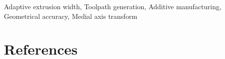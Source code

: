 \documentclass[5p,twocolumn,10pt,times]{elsarticle}
\theoremstyle{definition}
\newcommand{\temp}[1]{\textcolor[rgb]{0, 0, 0.2}{#1}}
\begin{document}
\begin{frontmatter}
%
%


\begin{keyword} 
Adaptive extrusion width, Toolpath generation, Additive manufacturing, Geometrical accuracy, Medial axis transform
\end{keyword}

\end{frontmatter}



















\section*{References}



\begin{appendices}





\end{appendices}
\end{document}

